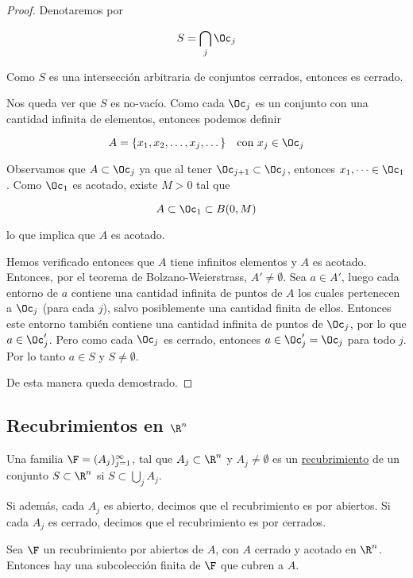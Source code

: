 \begin{proof}
    Denotaremos por
    
    \[
    S = \bigcap_j \Oc_j
    \]
    
    Como $S$ es una intersección arbitraria de conjuntos cerrados, entonces es cerrado.
    
    Nos queda ver que $S$ es no-vacío. Como cada $\Oc_j$ es un conjunto con una cantidad infinita de elementos, entonces podemos definir
    
    \[
    A = \{x_1, x_2, \dots, x_j, \dots\} \quad \text{con $x_j \in \Oc_j$}
    \]
    
    Observamos que $A \subset \Oc_j$ ya que al tener $\Oc_{j+1} \subset \Oc_j$, entonces $x_1, \dots \in \Oc_1$. Como $\Oc_1$ es acotado, existe $M > 0$ tal que
    
    \[
    A \subset \Oc_1 \subset B(0, M)
    \]
    
    \noindent lo que implica que $A$ es acotado.
    
    Hemos verificado entonces que $A$ tiene infinitos elementos y $A$ es acotado. Entonces, por el teorema de Bolzano-Weierstrass, $A' \neq \emptyset$. Sea $a \in A'$, luego cada entorno de $a$ contiene una cantidad infinita de puntos de $A$ los cuales pertenecen a $\Oc_j$ (para cada $j$), salvo posiblemente una cantidad finita de ellos. Entonces este entorno también contiene una cantidad infinita de puntos de $\Oc_j$, por lo que $a \in \Oc_j'$. Pero como cada $\Oc_j$ es cerrado, entonces $a \in \Oc_j' = \Oc_j$ para todo $j$. Por lo tanto $a \in S$ y $S \neq \emptyset$.
    
    De esta manera queda demostrado.
\end{proof}

\subsection{Recubrimientos en $\R^n$}

\begin{defn}
    Una familia $\F = (A_j)_{j=1}^{\infty}$, tal que $A_j \subset \R^n$ y $A_j \neq \emptyset$ es un \ul{recubrimiento} de un conjunto $S \subset \R^n$ si $S \subset \bigcup_j A_j$.
    
    Si además, cada $A_j$ es abierto, decimos que el recubrimiento es por abiertos. Si cada $A_j$ es cerrado, decimos que el recubrimiento es por cerrados.
\end{defn}

\begin{teo}
    Sea $\F$ un recubrimiento por abiertos de $A$, con $A$ cerrado y acotado en $\R^n$. Entonces hay una subcolección finita de $\F$ que cubren a $A$.
\end{teo}

